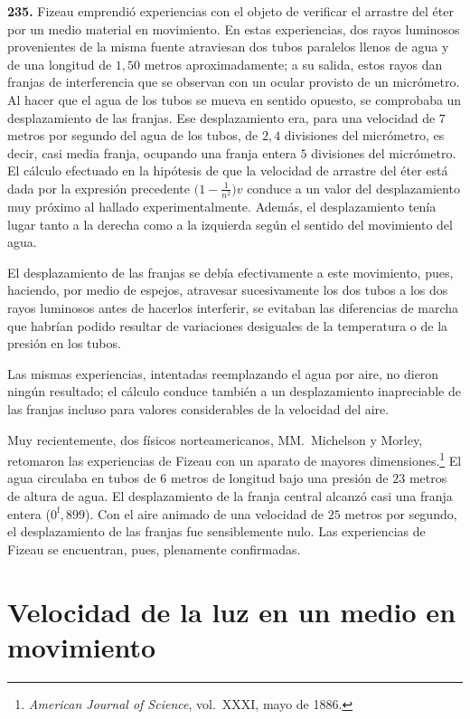 \noindent\textbf{235.} Fizeau emprendió experiencias con el objeto de
verificar el arrastre del éter por un medio material en movimiento. En
estas experiencias, dos rayos luminosos provenientes de la misma fuente
atraviesan dos tubos paralelos llenos de agua y de una longitud de $1{,}50$
metros aproximadamente; a su salida, estos rayos dan franjas de
interferencia que se observan con un ocular provisto de un micrómetro. Al
hacer que el agua de los tubos se mueva en sentido opuesto, se comprobaba
un desplazamiento de las franjas. Ese desplazamiento era, para una
velocidad de $7$ metros por segundo del agua de los tubos, de $2{,}4$
divisiones del micrómetro, es decir, casi media franja, ocupando una franja
entera $5$ divisiones del micrómetro. El cálculo efectuado en la hipótesis de que la velocidad de
arrastre del éter está dada por la expresión precedente
$\bigl(1-\tfrac{1}{n^2}\bigr)v$ conduce a un valor del desplazamiento muy
próximo al hallado experimentalmente. Además, el desplazamiento tenía lugar
tanto a la derecha como a la izquierda según el sentido del movimiento del
agua.

El desplazamiento de las franjas se debía efectivamente a este movimiento,
pues, haciendo, por medio de espejos, atravesar sucesivamente los dos tubos
a los dos rayos luminosos antes de hacerlos interferir, se evitaban las
diferencias de marcha que habrían podido resultar de variaciones desiguales
de la temperatura o de la presión en los tubos.

Las mismas experiencias, intentadas reemplazando el agua por aire, no
dieron ningún resultado; el cálculo conduce también a un desplazamiento
inapreciable de las franjas incluso para valores considerables de la
velocidad del aire.

Muy recientemente, dos físicos norteamericanos, MM.~Michelson y
Morley, retomaron las experiencias de Fizeau con un aparato de mayores
dimensiones.\footnote{\emph{American Journal of Science}, vol.~XXXI, mayo
de 1886.} El agua circulaba en tubos de $6$ metros de longitud bajo una
presión de $23$ metros de altura de agua. El desplazamiento de la franja
central alcanzó casi una franja entera ($0^{\text{f}}{,}899$). Con el aire
animado de una velocidad de $25$ metros por segundo, el desplazamiento de
las franjas fue sensiblemente nulo. Las experiencias de Fizeau se
encuentran, pues, plenamente confirmadas.

\section{Velocidad de la luz en un medio en movimiento}

